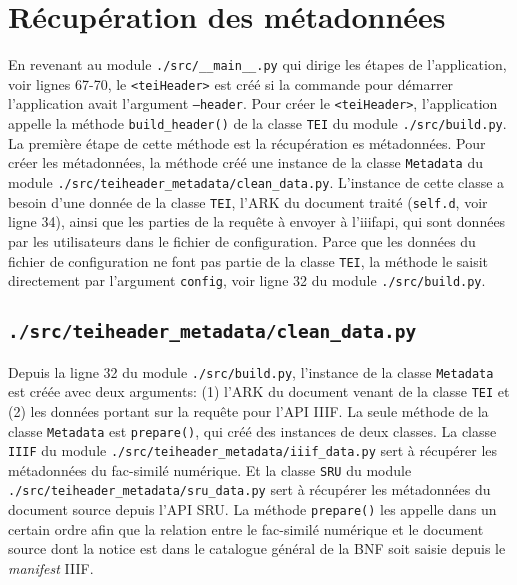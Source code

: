 \documentclass[class=article, crop=false]{standalone}
\begin{document}
\section{Récupération des métadonnées}
En revenant au module \texttt{./src/\_\_main\_\_.py} qui dirige les étapes de l'application, voir lignes 67-70, le \texttt{<teiHeader>} est créé si la commande pour démarrer l'application avait l'argument \texttt{--header}. Pour créer le \texttt{<teiHeader>}, l'application appelle la méthode \texttt{build\_header()} de la classe \texttt{TEI} du module \texttt{./src/build.py}. La première étape de cette méthode est la récupération es métadonnées. Pour créer les métadonnées, la méthode créé une instance de la classe \texttt{Metadata} du module \texttt{./src/teiheader\_metadata/clean\_data.py}. L'instance de cette classe a besoin d'une donnée de la classe \texttt{TEI}, l'\acrshort{ARK} du document traité (\texttt{self.d}, voir ligne 34), ainsi que les parties de la requête à envoyer à l'\Gls{iiifapi}, qui sont données par les utilisateurs dans le fichier de configuration. Parce que les données du fichier de configuration ne font pas partie de la classe \texttt{TEI}, la méthode le saisit directement par l'argument \texttt{config}, voir ligne 32 du module \texttt{./src/build.py}.

\subsection{\texttt{./src/teiheader\_metadata/clean\_data.py}}
Depuis la ligne 32 du module \texttt{./src/build.py}, l'instance de la classe \texttt{Metadata} est créée avec deux arguments: (1) l'\acrshort{ARK} du document venant de la classe \texttt{TEI} et (2) les données portant sur la requête pour l'\acrshort{API} \acrshort{IIIF}. La seule méthode de la classe \texttt{Metadata} est \texttt{prepare()}, qui créé des instances de deux classes. La classe \texttt{IIIF} du module \texttt{./src/teiheader\_metadata/iiif\_data.py} sert à récupérer les métadonnées du fac-similé numérique. Et la classe \texttt{SRU} du module \texttt{./src/teiheader\_metadata/sru\_data.py} sert à récupérer les métadonnées du document source depuis l'\acrshort{API} \acrshort{SRU}. La méthode \texttt{prepare()} les appelle dans un certain ordre afin que la relation entre le fac-similé numérique et le document source dont la notice est dans le catalogue général de la \acrshort{BNF} soit saisie depuis le \textit{manifest} \acrshort{IIIF}.
\end{document}
